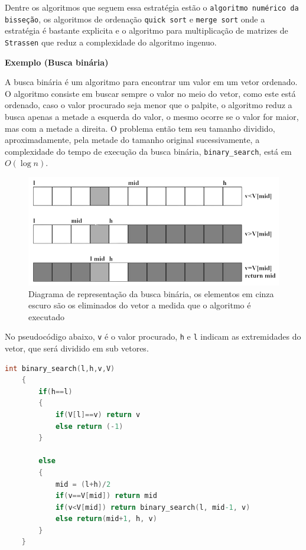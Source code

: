 Dentre os algoritmos que seguem essa estratégia estão o \texttt{algoritmo numérico da bisseção}, os algoritmos de ordenação \texttt{quick sort} e \texttt{merge sort} onde a estratégia é bastante explicita e o algoritmo para multiplicação de matrizes de \texttt{Strassen} que reduz a complexidade do algoritmo ingenuo.

\textbf{Exemplo (Busca binária)}

A busca binária é um algoritmo para encontrar um valor em um vetor ordenado. O algoritmo consiste em buscar sempre o valor no meio do vetor, como este está ordenado, caso o valor procurado seja menor que o palpite, o algoritmo reduz a busca apenas a metade a esquerda do valor, o mesmo ocorre se o valor for maior, mas com a metade a direita. O problema então tem seu tamanho dividido, aproximadamente, pela metade do tamanho original sucessivamente, a complexidade do tempo de execução da busca binária, \texttt{binary\_search}, está em $O(\log n)$.

\begin{figure}
  \centering
  \includegraphics[width=1\linewidth]{img/binary_search.png}
    \caption{Diagrama de representação da busca binária, os elementos em cinza escuro são os eliminados do vetor a medida que o algoritmo é executado}
    \label{binary_search}
\end{figure}

No pseudocódigo abaixo, \texttt{v} é o valor procurado, \texttt{h} e \texttt{l} indicam as extremidades do vetor, que será dividido em sub vetores.

\begin{lstlisting}[language=C, frame=single]
    int binary_search(l,h,v,V)
    {
        if(h==l)
        {
            if(V[l]==v) return v
            else return (-1)
        }
        
        else
        {
            mid = (l+h)/2
            if(v==V[mid]) return mid
            if(v<V[mid]) return binary_search(l, mid-1, v)
            else return(mid+1, h, v)
        }
    }
\end{lstlisting}

